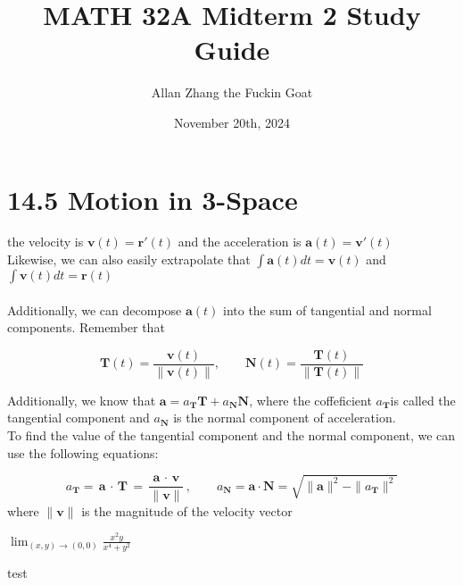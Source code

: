 \documentclass[hidelinks]{article}
\title{\textbf{MATH 32A Midterm 2 Study Guide}}
\author{Allan Zhang the Fuckin Goat}
\date{November 20th, 2024}
\begin{document}
\hypersetup{bookmarksnumbered=true,}
\pagecolor{white}
\color{black}
\maketitle

\section{14.5 Motion in 3-Space}


the velocity is $\textbf{v}(t) = \textbf{r}'(t)$ and the acceleration is $\textbf{a}(t) = \textbf{v}'(t)$ \\
Likewise, we can also easily extrapolate that $\int{\textbf{a}(t) dt} = \textbf{v}(t)$ and $\int\textbf{v}(t) dt = \textbf{r}(t)$ \\\\
Additionally, we can decompose $\textbf{a}(t)$ into the sum of tangential and normal components. Remember that 


\[
	\textbf{T}(t) = \frac{\textbf{v}(t)}{\|\textbf{v}(t)\|}, \quad \quad  \textbf{N}(t)= \frac{\textbf{T}(t)}{\|\textbf{T}(t)\|}
\]

Additionally, we know that $\textbf{a} = a_{\textbf{T}}\textbf{T} + a_{\textbf{N}}\textbf{N}$, where the coffeficient $a_{\textbf{T}}$is called the tangential component and $a_{\textbf{N}}$ is the normal component of acceleration. \\
To find the value of the tangential component and the normal component, we can use the following equations: 

\[
	a_{\textbf{T}} = \textbf{a $\cdot$ T} = \frac{\textbf{a $\cdot$ v}}{\|\textbf{v}\|}, \quad \quad a_{\textbf{N}} = \textbf{a} \cdot \textbf{N} = \sqrt{\|\textbf{a}\|^2 - \|a_{\textbf{T}}\|^2}
\] where $\|\textbf{v}\|$ is the magnitude of the velocity vector





$\lim_{(x, y) \to (0, 0)}{\frac{x^2y}{x^4+y^2}}$



test
\end{document}
